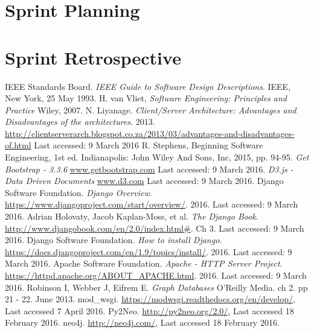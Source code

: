 \documentclass[10pt,onecolumn]{article}
\begin{document}
\section{Sprint Planning} %

\section{Sprint Retrospective} %

\begin{thebibliography}{1}
	 IEEE Standards Board. \emph{IEEE Guide to Software Design Descriptions}. IEEE, New York, 25 May 1993.
	 H. van Vliet, \emph{Software Engineering: Principles and Practice} Wiley, 2007.
	 N. Liyanage. \emph{Client/Server Architecture: Advantages and Disadvantages of the architectures}. 2013. \url{http://clientserverarch.blogspot.co.za/2013/03/advantages-and-disadvantages-of.html} Last accessed: 9 March 2016
	 R. Stephens, Beginning Software Engineering, 1st ed. Indianapolis: John Wiley And Sons, Inc, 2015, pp. 94-95.
	  \emph{Get Bootstrap - 3.3.6} \url{www.getbootstrap.com} Last accessed: 9 March 2016.
	  \emph{D3.js - Data Driven Documents} \url{www.d3.com} Last accessed: 9 March 2016.
	 Django Software Foundation. \emph{Django Overview}. \url{https://www.djangoproject.com/start/overview/}. 2016. Last accessed: 9 March 2016. 
	 Adrian Holovaty, Jacob Kaplan-Moss, et al. \emph{The Django Book}. \url{http://www.djangobook.com/en/2.0/index.html#}. Ch 3. Last accessed: 9 March 2016.
	 Django Software Foundation. \emph{How to install Django}. \url{https://docs.djangoproject.com/en/1.9/topics/install/}. 2016. Last accessed: 9 March 2016.	
	 Apache Software Foundation. \emph{Apache - HTTP Server Project}. \url{https://httpd.apache.org/ABOUT_APACHE.html}. 2016. Last accessed: 9 March 2016.	
	 Robinson I, Webber J, Eifrem E. \emph{Graph Databases} O'Reilly Media. ch 2. pp 21 - 22. June 2013.
	 mod\_wsgi. \url{https://modwsgi.readthedocs.org/en/develop/}, Last accessed 7 April 2016.
	 Py2Neo. \url{http://py2neo.org/2.0/}, Last accessed 18 February 2016.
	 neo4j. \url{http://neo4j.com/}, Last accessed 18 February 2016.


\end{thebibliography}
\end{document}
